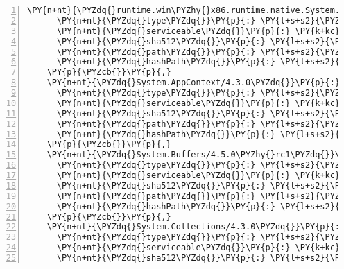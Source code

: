 \begin{Verbatim}[commandchars=\\\{\},numbers=left,firstnumber=1,stepnumber=1,numberblanklines=0]
    \PY{n+nt}{\PYZdq{}runtime.win\PYZhy{}x86.runtime.native.System.Data.SqlClient.sni/4.4.0\PYZdq{}}\PY{p}{:} \PY{p}{\PYZob{}}
      \PY{n+nt}{\PYZdq{}type\PYZdq{}}\PY{p}{:} \PY{l+s+s2}{\PYZdq{}package\PYZdq{}}\PY{p}{,}
      \PY{n+nt}{\PYZdq{}serviceable\PYZdq{}}\PY{p}{:} \PY{k+kc}{true}\PY{p}{,}
      \PY{n+nt}{\PYZdq{}sha512\PYZdq{}}\PY{p}{:} \PY{l+s+s2}{\PYZdq{}sha512\PYZhy{}YhEdSQUsTx+C8m8Bw7ar5/VesXvCFMItyZF7G1AUY+OM0VPZUOeAVpJ4Wl6fydBGUYZxojTDR3I6Bj/+BPkJNA==\PYZdq{}}\PY{p}{,}
      \PY{n+nt}{\PYZdq{}path\PYZdq{}}\PY{p}{:} \PY{l+s+s2}{\PYZdq{}runtime.win\PYZhy{}x86.runtime.native.system.data.sqlclient.sni/4.4.0\PYZdq{}}\PY{p}{,}
      \PY{n+nt}{\PYZdq{}hashPath\PYZdq{}}\PY{p}{:} \PY{l+s+s2}{\PYZdq{}runtime.win\PYZhy{}x86.runtime.native.system.data.sqlclient.sni.4.4.0.nupkg.sha512\PYZdq{}}
    \PY{p}{\PYZcb{}}\PY{p}{,}
    \PY{n+nt}{\PYZdq{}System.AppContext/4.3.0\PYZdq{}}\PY{p}{:} \PY{p}{\PYZob{}}
      \PY{n+nt}{\PYZdq{}type\PYZdq{}}\PY{p}{:} \PY{l+s+s2}{\PYZdq{}package\PYZdq{}}\PY{p}{,}
      \PY{n+nt}{\PYZdq{}serviceable\PYZdq{}}\PY{p}{:} \PY{k+kc}{true}\PY{p}{,}
      \PY{n+nt}{\PYZdq{}sha512\PYZdq{}}\PY{p}{:} \PY{l+s+s2}{\PYZdq{}sha512\PYZhy{}fKC+rmaLfeIzUhagxY17Q9siv/sPrjjKcfNg1Ic8IlQkZLipo8ljcaZQu4VtI4Jqbzjc2VTjzGLF6WmsRXAEgA==\PYZdq{}}\PY{p}{,}
      \PY{n+nt}{\PYZdq{}path\PYZdq{}}\PY{p}{:} \PY{l+s+s2}{\PYZdq{}system.appcontext/4.3.0\PYZdq{}}\PY{p}{,}
      \PY{n+nt}{\PYZdq{}hashPath\PYZdq{}}\PY{p}{:} \PY{l+s+s2}{\PYZdq{}system.appcontext.4.3.0.nupkg.sha512\PYZdq{}}
    \PY{p}{\PYZcb{}}\PY{p}{,}
    \PY{n+nt}{\PYZdq{}System.Buffers/4.5.0\PYZhy{}rc1\PYZdq{}}\PY{p}{:} \PY{p}{\PYZob{}}
      \PY{n+nt}{\PYZdq{}type\PYZdq{}}\PY{p}{:} \PY{l+s+s2}{\PYZdq{}package\PYZdq{}}\PY{p}{,}
      \PY{n+nt}{\PYZdq{}serviceable\PYZdq{}}\PY{p}{:} \PY{k+kc}{true}\PY{p}{,}
      \PY{n+nt}{\PYZdq{}sha512\PYZdq{}}\PY{p}{:} \PY{l+s+s2}{\PYZdq{}sha512\PYZhy{}4y5TI/pffxHW8aFFcAVTNsnT0HvCJN3RwYbSbHtVXgnaDDQ9s54Z1aAqDKEkQYb+MWgfcnmeAITRRXeLflsdsw==\PYZdq{}}\PY{p}{,}
      \PY{n+nt}{\PYZdq{}path\PYZdq{}}\PY{p}{:} \PY{l+s+s2}{\PYZdq{}system.buffers/4.5.0\PYZhy{}rc1\PYZdq{}}\PY{p}{,}
      \PY{n+nt}{\PYZdq{}hashPath\PYZdq{}}\PY{p}{:} \PY{l+s+s2}{\PYZdq{}system.buffers.4.5.0\PYZhy{}rc1.nupkg.sha512\PYZdq{}}
    \PY{p}{\PYZcb{}}\PY{p}{,}
    \PY{n+nt}{\PYZdq{}System.Collections/4.3.0\PYZdq{}}\PY{p}{:} \PY{p}{\PYZob{}}
      \PY{n+nt}{\PYZdq{}type\PYZdq{}}\PY{p}{:} \PY{l+s+s2}{\PYZdq{}package\PYZdq{}}\PY{p}{,}
      \PY{n+nt}{\PYZdq{}serviceable\PYZdq{}}\PY{p}{:} \PY{k+kc}{true}\PY{p}{,}
      \PY{n+nt}{\PYZdq{}sha512\PYZdq{}}\PY{p}{:} \PY{l+s+s2}{\PYZdq{}sha512\PYZhy{}3Dcj85/TBdVpL5Zr+gEEBUuFe2icOnLalmEh9hfck1PTYbbyWuZgh4fmm2ysCLTrqLQw6t3TgTyJ+VLp+Qb+Lw==\PYZdq{}}\PY{p}{,}

\end{Verbatim}
